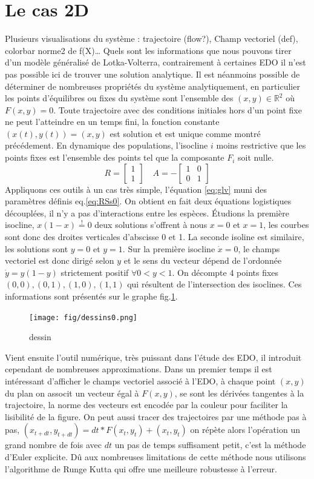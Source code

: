 \documentclass{wsdcr}
\begin{document}
\section{Le cas 2D}
\label{sec:lv2}
Plusieurs visualisations du système : trajectoire (flow?), Champ vectoriel (def), colorbar norme2 de f(X)…
Quels sont les informations que nous pouvons tirer d'un modèle généralisé de Lotka-Volterra, contrairement à certaines EDO il n'est pas possible ici de trouver une solution analytique. Il est néanmoins possible de déterminer de nombreuses propriétés du système analytiquement, en particulier les points d'équilibres ou fixes du système sont l'ensemble des $(x,y)\in \mathbb{R}^2$ où $F(x,y)=0$. Toute trajectoire avec des conditions initiales hors d'un point fixe ne peut l'atteindre en un temps fini, la fonction constante $(x(t),y(t))=(x,y)$ est solution et est unique comme montré précédement. En dynamique des populations, l'isocline $i$ moins restrictive que les points fixes est l'ensemble des points tel que la composante $F_i$ soit nulle.
\begin{equation}
R={\begin{bmatrix}1\\1\end{bmatrix}}\quad A =-{\begin{bmatrix}1&0\\0&1\end{bmatrix}}
\label{eq:RSs0}
\end{equation}
Appliquons ces outils à un cas très simple, l'équation \ref{eq:glv} muni des paramètres définis eq.\ref{eq:RSs0}. On obtient en fait deux équations logistiques découplées, il n'y a pas d'interactions entre les espèces. Étudions la première isocline, $x(1-x)\overset{!}{=}0$ deux solutions s'offrent à nous $x=0$ et $x=1$, les courbes sont donc des droites verticales d'abscisse 0 et 1. La seconde isoline est similaire, les solutions sont $y=0$ et $y=1$. Sur la première isocline $\dot{x}=0$, le champs vectoriel est donc dirigé selon $y$ et le sens du vecteur dépend de l'ordonnée $\dot{y}=y(1-y)$  strictement positif $\forall 0<y<1$. On décompte 4 points fixes ${(0,0),(0,1),(1,0),(1,1)}$ qui résultent de l'intersection des isoclines. Ces informations sont présentés sur le graphe fig.\ref{fig:dessinlv2s0}.
\begin{figure}
    \centering
    \texttt{[image: fig/dessins0.png]}
    \caption{dessin}
    \label{fig:dessinlv2s0}
\end{figure}
Vient ensuite l'outil numérique, très puissant dans l'étude des EDO, il introduit cependant de nombreuses approximations. Dans un premier temps il est intéressant d'afficher le champs vectoriel associé à l'EDO, à chaque point $(x,y)$ du plan on associt un vecteur égal à $F(x,y)$, se sont les dérivées tangentes à la trajectoire, la norme des vecteurs est encodée par la couleur pour faciliter la lisibilité de la figure. On peut aussi tracer des trajectoires par une méthode pas à pas, $(x_{t+dt},y_{t+dt})=dt*F(x_{t},y_{t})+(x_{t},y_{t})$ on répète alors l'opération un grand nombre de fois avec $dt$ un pas de temps suffisament petit, c'est la méthode d'Euler explicite. Dû aux nombreuses limitations de cette méthode nous utilisons l'algorithme de Runge Kutta qui offre une meilleure robustesse à l'erreur.
\end{document}
